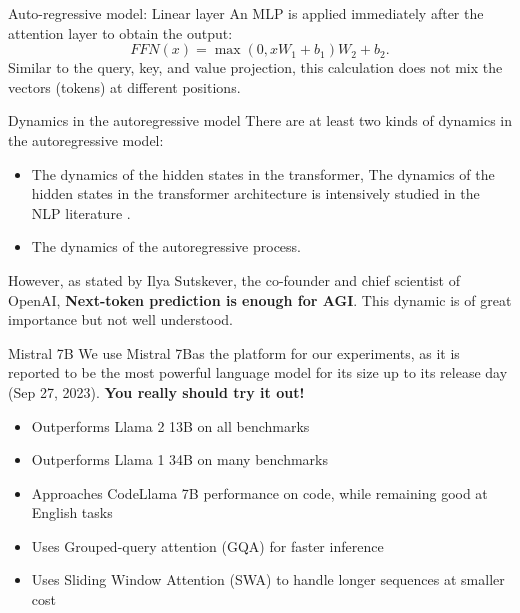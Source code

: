 \documentclass{beamer}
\begin{document}
\begin{frame}{Auto-regressive model: Linear layer}
	An MLP is applied immediately after the attention layer to obtain the output:
	\begin{equation}
		FFN(x) = \max(0, xW_1 + b_1)W_2 + b_2.
	\end{equation}
	Similar to the query, key, and value projection, this calculation does not mix the vectors 
	(tokens) at different positions.
\end{frame}

\begin{frame}{Dynamics in the autoregressive model}
	There are at least two kinds of dynamics in the autoregressive model:
	\begin{itemize}
		\item The dynamics of the hidden states in the transformer, The dynamics of the hidden states in the 
		transformer architecture is intensively studied in the NLP literature \footnotemark[4].
		\item The dynamics of the autoregressive process.
	\end{itemize}
	However, as stated by Ilya Sutskever, the co-founder and chief scientist of OpenAI, \textbf{Next-token prediction
	is enough for AGI}. This dynamic is of great importance but not well understood.
\end{frame}

\begin{frame}{Mistral 7B}
	We use Mistral 7B\footnotemark as the platform for our experiments, as it is reported to be the most powerful language 
	model for its size up to its release day (Sep 27, 2023). \textbf{You really should try it out!}

	\begin{itemize}
		\item Outperforms Llama 2 13B on all benchmarks
		\item Outperforms Llama 1 34B on many benchmarks
		\item Approaches CodeLlama 7B performance on code, while remaining good at English tasks
		\item Uses Grouped-query attention (GQA) for faster inference
		\item Uses Sliding Window Attention (SWA) to handle longer sequences at smaller cost
	\end{itemize}
\end{frame}
\end{document}
